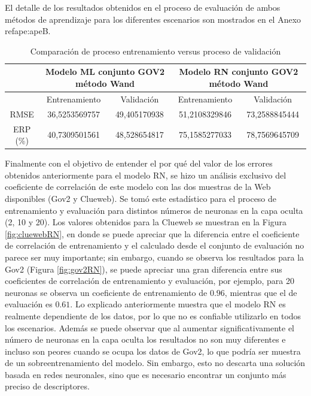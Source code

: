 El detalle de los resultados obtenidos en el proceso de evaluación de ambos métodos de aprendizaje para los diferentes escenarios son mostrados en el Anexo ref{ape:apeB}.

\begin{table}[tp]
\caption{Comparación de proceso entrenamiento versus proceso de validación}
\begin{center}
\begin{tabular}{|c|c|c|c|c|}
\hline
 & \multicolumn{ 2}{c|}{Modelo ML conjunto GOV2 método Wand} & \multicolumn{ 2}{c|}{Modelo RN   conjunto GOV2 método Wand} \\ \hline
 & Entrenamiento & Validación & Entrenamiento & Validación \\ \hline
RMSE & 36,5253569757 & 49,405170938 & 51,2108329846 & 73,2588845444 \\ \hline
ERP (\%) & 40,7309501561 & 48,528654817 & 75,1585277033 & 78,7569645709 \\ \hline
\end{tabular}
\end{center}
\label{validacion_modelos_gov2_wand}
\end{table}

Finalmente con el objetivo de entender el por qué del valor de los errores obtenidos anteriormente para el modelo RN, se hizo un análisis exclusivo del coeficiente de correlación de este modelo con las dos muestras de la Web disponibles (Gov2 y Clueweb). Se tomó este estadístico para el proceso de entrenamiento y evaluación para distintos números de neuronas en la capa oculta (2, 10 y 20). Los valores obtenidos para la Clueweb se muestran en la Figura \ref{fig:cluewebRN}, en donde se puede apreciar que la diferencia entre el coeficiente de correlación de entrenamiento y el calculado desde el conjunto de evaluación no parece ser muy importante; sin embargo, cuando se observa los resultados para la Gov2 (Figura \ref{fig:gov2RN}), se puede apreciar una gran diferencia entre sus coeficientes de correlación de entrenamiento y evaluación, por ejemplo, para 20 neuronas se observa un coeficiente de entrenamiento de $0.96$, mientras que el de evaluación es $0.61$. Lo explicado anteriormente muestra que el modelo RN es realmente dependiente de los datos, por lo que no es confiable utilizarlo en todos los escenarios. Además se puede observar que al aumentar significativamente el número de neuronas en la capa oculta los resultados no son muy diferentes e incluso son peores cuando se ocupa los datos de Gov2, lo que podría ser muestra de un sobreentrenamiento del modelo. Sin embargo, esto no descarta una solución basada en redes neuronales, sino que es necesario encontrar un conjunto más preciso de descriptores.

